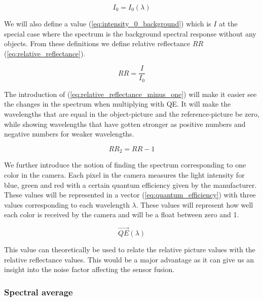 \begin{equation}
    \label{eq:intensity_0_background}
    I_0 = I_0(\lambda)
\end{equation}

We will also define a value (\ref{eq:intensity_0_background}) which is $I$ at the special case where the spectrum is the background spectral response without any objects. From these definitions we define relative reflectance $RR$ (\ref{eq:relative_reflectance}). 

\begin{equation}
    \label{eq:relative_reflectance}
    RR = \frac{I}{I_0}
\end{equation}

The introduction of (\ref{eq:relative_reflectance_minus_one}) will make it easier see the changes in the spectrum when multiplying with QE. It will make the wavelengths that are equal in the object-picture and the reference-picture be zero, while showing wavelengths that have gotten stronger as positive numbers and negative numbers for weaker wavelengths.  

\begin{equation}
    \label{eq:relative_reflectance_minus_one}
    RR_2 = RR - 1
\end{equation}

We further introduce the notion of finding the spectrum corresponding to one color in the camera. Each pixel in the camera measures the light intensity for blue, green and red with a certain quantum efficiency given by the manufacturer. These values will be represented in a vector (\ref{eq:quantum_efficiency}) with three values corresponding to each wavelength $\lambda$. These values will represent how well each color is received by the camera and will be a float between zero and 1. 

\begin{equation}
    \label{eq:quantum_efficiency}
    \vec{QE}(\lambda)    
\end{equation}

This value can theoretically be used to relate the relative picture values with the relative reflectance values. This would be a major advantage as it can give us an insight into the noise factor affecting the sensor fusion.  

\subsubsection{Spectral average}
\label{sec:spectral_average}

